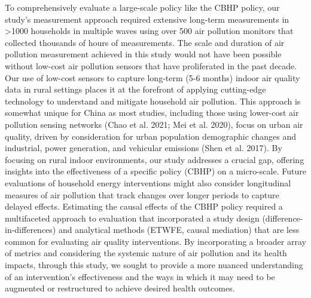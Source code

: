 \documentclass[
  letterpaper,
  DIV=11,
  numbers=noendperiod]{scrartcl}
\providecommand{\DIFaddtex}[1]{{\protect\color{blue}\uwave{#1}}} %
\providecommand{\DIFaddbegin}{} %
\providecommand{\DIFaddend}{} %
\providecommand{\DIFdelbegin}{} %
\providecommand{\DIFdelend}{} %
\providecommand{\DIFadd}[1]{\texorpdfstring{\DIFaddtex{#1}}{#1}} %
\newcommand{\DIFscaledelfig}{0.5}
\newlength{\DIFdelgraphicswidth} %
\newlength{\DIFdelgraphicsheight} %
\newcommand{\DIFaddincludegraphics}[2][]{{\color{blue}\fbox{\DIFOincludegraphics[#1]{#2}}}} %
\newcommand{\DIFdelincludegraphics}[2][]{%
\sbox{\DIFdelgraphicsbox}{\DIFOincludegraphics[#1]{#2}}%
\settoboxwidth{\DIFdelgraphicswidth}{\DIFdelgraphicsbox} %
\settoboxtotalheight{\DIFdelgraphicsheight}{\DIFdelgraphicsbox} %
\scalebox{\DIFscaledelfig}{%
\parbox[b]{\DIFdelgraphicswidth}{\usebox{\DIFdelgraphicsbox}\\[-\baselineskip] \rule{\DIFdelgraphicswidth}{0em}}\llap{\resizebox{\DIFdelgraphicswidth}{\DIFdelgraphicsheight}{%
\setlength{\unitlength}{\DIFdelgraphicswidth}%
\begin{picture}(1,1)%
\thicklines\linethickness{2pt} %
{\color[rgb]{1,0,0}\put(0,0){\framebox(1,1){}}}%
{\color[rgb]{1,0,0}\put(0,0){\line( 1,1){1}}}%
{\color[rgb]{1,0,0}\put(0,1){\line(1,-1){1}}}%
\end{picture}%
}\hspace*{3pt}}} %
} %
\DeclareRobustCommand{\DIFaddbegin}{\DIFOaddbegin \let\includegraphics\DIFaddincludegraphics} %
\DeclareRobustCommand{\DIFaddend}{\DIFOaddend \let\includegraphics\DIFOincludegraphics} %
\DeclareRobustCommand{\DIFdelbegin}{\DIFOdelbegin \let\includegraphics\DIFdelincludegraphics} %
\DeclareRobustCommand{\DIFdelend}{\DIFOaddend \let\includegraphics\DIFOincludegraphics} %
\begin{document}
To comprehensively evaluate a large-scale policy like the CBHP policy,
our study's measurement approach required extensive long-term
measurements in \textgreater1000 households in multiple waves using over
500 air pollution monitors that collected thousands of hours of
measurements. The scale and duration of air pollution measurement
achieved in this study would not have been possible without low-cost air
pollution sensors that have proliferated in the past decade. Our use of
low-cost sensors to capture long-term (5-6 months) indoor air quality
data in rural settings places it at the forefront of applying
cutting-edge technology to understand and mitigate household air
pollution. This approach is somewhat unique for China as most studies,
including those using lower-cost air pollution sensing networks (Chao et
al. 2021; Mei et al. 2020), focus on urban air quality, driven by
consideration for urban population demographic changes and industrial,
power generation, and vehicular emissions (Shen et al. 2017). By
focusing on rural indoor environments, our study addresses a crucial
gap, offering insights into the effectiveness of a specific policy
(CBHP) on a micro-scale. Future evaluations of household energy
interventions might also consider longitudinal measures of air pollution
that track changes over longer periods to capture delayed effects.
Estimating the causal effects of the CBHP policy required a multifaceted
approach to evaluation that incorporated a study design
(difference-in-differences) and analytical methods (ETWFE, causal
mediation) that are less common for evaluating air quality
interventions. By incorporating a broader array of metrics and
considering the systemic nature of air pollution and its health impacts,
through this study, we sought to provide a more nuanced understanding of
an intervention's effectiveness and the ways in which it may need to be
augmented or restructured to achieve desired health outcomes.

\DIFdelbegin %
\DIFdelend \DIFaddbegin \subsection{\DIFadd{Assumptions, strengths, and
limitations}}\label{assumptions-strengths-and-limitations}
\DIFaddend 
\end{document}
